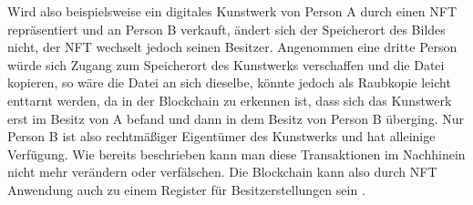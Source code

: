 Wird also beispielsweise ein digitales Kunstwerk von Person A durch einen \ac{NFT} repräsentiert und an Person B verkauft,
ändert sich der Speicherort des Bildes nicht, der \ac{NFT} wechselt jedoch seinen Besitzer.
Angenommen eine dritte Person würde sich Zugang zum Speicherort des Kunstwerks verschaffen und die Datei kopieren, so wäre die Datei an sich dieselbe,
könnte jedoch als Raubkopie leicht enttarnt werden,
da in der Blockchain zu erkennen ist, dass sich das Kunstwerk erst im Besitz von A befand und dann in dem Besitz von Person B überging.
Nur Person B ist also rechtmäßiger Eigentümer des Kunstwerks und hat alleinige Verfügung.
Wie bereits beschrieben kann man diese Transaktionen im Nachhinein nicht mehr verändern oder verfälschen.
Die Blockchain kann also durch \ac{NFT} Anwendung auch zu einem Register für Besitzerstellungen sein \parencite[vgl.][567]{Hoeren.2021}.